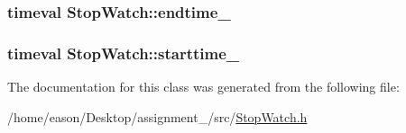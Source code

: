 \subsubsection[{\texorpdfstring{endtime\+\_\+}{endtime_}}]{\setlength{\rightskip}{0pt plus 5cm}timeval Stop\+Watch\+::endtime\+\_\+\hspace{0.3cm}{\ttfamily [private]}}\hypertarget{classStopWatch_ac4092981269811b221e31ab5bc0a8ce2}{}\label{classStopWatch_ac4092981269811b221e31ab5bc0a8ce2}
\subsubsection[{\texorpdfstring{starttime\+\_\+}{starttime_}}]{\setlength{\rightskip}{0pt plus 5cm}timeval Stop\+Watch\+::starttime\+\_\+\hspace{0.3cm}{\ttfamily [private]}}\hypertarget{classStopWatch_ada5556538f0ebec66b6e45b846ca3864}{}\label{classStopWatch_ada5556538f0ebec66b6e45b846ca3864}


The documentation for this class was generated from the following file\+:\begin{DoxyCompactItemize}
\item 
/home/eason/\+Desktop/assignment\+\_/src/\hyperlink{StopWatch_8h}{Stop\+Watch.\+h}\end{DoxyCompactItemize}
